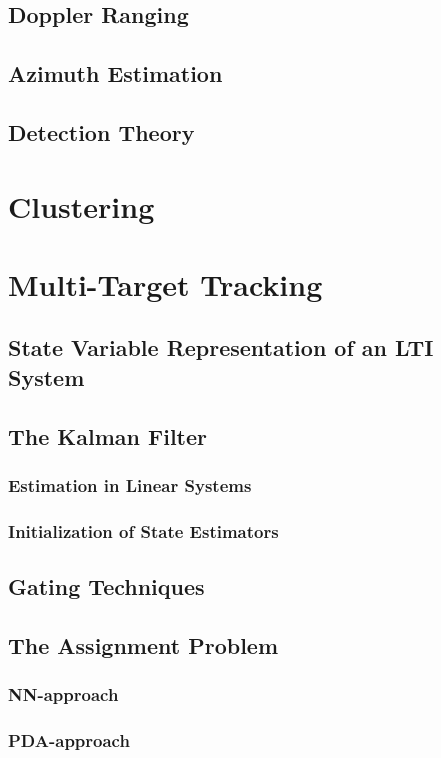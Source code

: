 \documentclass[DIV=15,
fleqn
numbers=noenddot,
headsepline,
captions=tableabove,twoside, openright]{scrreprt}
\begin{document}
\section{Doppler Ranging}\label{bs:dopplerRanging}
\section{Azimuth Estimation}
\section{Detection Theory}\label{bs:detection}
\chapter{Clustering}
\chapter{Multi-Target Tracking}

\section{State Variable Representation of an LTI System}\label{mtt:state}

\section{The Kalman Filter}\label{mtt:kalman}
 
 \subsection{Estimation in Linear Systems}
 
\subsection{Initialization of State Estimators}

\section{Gating Techniques}\label{mtt:gating}

\section{The Assignment Problem}\label{mtt:assign}

\subsection{NN-approach}\label{mtt:nn}

\subsection{PDA-approach}\label{mtt:pda}
\end{document}
